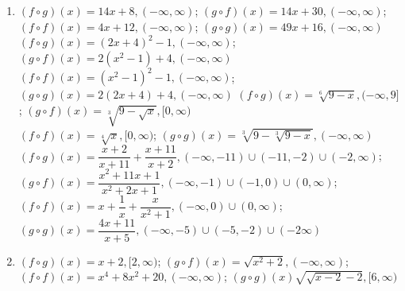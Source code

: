 \documentclass{book}
\begin{document}
\begin{appendices}
\begin{enumerate}[!HW!]
\item $(f\circ g)(x) = 14x+8, (-\infty,\infty)$; \quad $(g\circ f)(x) = 14x+30, (-\infty,\infty)$;\\
$(f\circ f)(x) = 4x+12, (-\infty,\infty)$; \quad $(g\circ g)(x) = 49x+16, (-\infty,\infty)$
\itemspade $(f\circ g)(x) = (2x+4)^2-1, (-\infty,\infty)$;\quad $(g\circ f)(x) = 2(x^2-1)+4, (-\infty,\infty)$\\
$(f\circ f)(x)  = (x^2-1)^2-1,  (-\infty,\infty)$; \quad $(g\circ g)(x) = 2(2x+4)+4, (-\infty,\infty)$
\itemspade $(f\circ g)(x) = \sqrt[6]{9-x}, (-\infty,9]$; \quad $(g\circ f)(x) = \sqrt[3]{9-\sqrt{x}}, [0,\infty)$\\
$(f\circ f)(x)  = \sqrt[4]{x},  [0,\infty)$; \quad $(g\circ g)(x) = \sqrt[3]{9-\sqrt[3]{9-x}}, (-\infty,\infty)$
\itemspade $(f\circ g)(x) = \dfrac{x+2}{x+11}+\dfrac{x+11}{x+2}, (-\infty,-11)\cup(-11,-2)\cup(-2,\infty)$; \\ 
$(g\circ f)(x) = \dfrac{x^2+11x+1}{x^2+2x+1}, (-\infty,-1)\cup(-1,0)\cup(0,\infty)$;\\
$(f\circ f)(x)  = x+\dfrac{1}{x}+\dfrac{x}{x^2+1},  (-\infty,0)\cup(0,\infty)$; \\
$(g\circ g)(x) = \dfrac{4x+11}{x+5}, (-\infty,-5)\cup(-5,-2)\cup(-2\infty)$
\item $(f\circ g)(x) = x+2, [2,\infty)$; \quad $(g\circ f)(x) = \sqrt{x^2+2}, (-\infty,\infty)$;\\
$(f\circ f)(x) = x^4+8x^2+20, (-\infty,\infty)$; \quad $(g\circ g)(x) \sqrt{\sqrt{x-2}-2}, [6,\infty)$

\end{enumerate}
\vspace{-15 pt}


\end{appendices}
\end{document}
